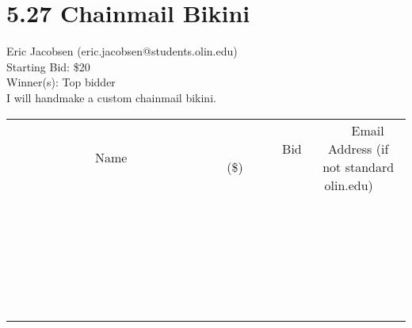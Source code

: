 \documentclass[11pt]{article}
\begin{document}
\section*{5.27 Chainmail Bikini}
Eric Jacobsen (eric.jacobsen@students.olin.edu) \\
Starting Bid: \$20 \\
Winner(s): 
Top bidder \\
I will handmake a custom chainmail bikini. \\[6ex]
\begin{tabular}{c c c}
~~~~~~~~~~~~~Name~~~~~~~~~~~~~ & ~~~~~~~~~Bid (\$)~~~~~~~~~ & ~~~Email Address (if not standard olin.edu)~~~ \\
 & & \\
\hline
 & & \\
\hline
 & & \\
\hline
 & & \\
\hline
 & & \\
\hline
 & & \\
\hline
 & & \\
\hline
 & & \\
\hline
 & & \\
\hline
 & & \\
\hline
 & & \\
\hline
 & & \\
\hline
 & & \\
\hline
 & & \\
\hline
 & & \\
\hline
 & & \\
\hline
 & & \\
\hline
 & & \\
\hline
 & & \\
\hline
 & & \\
\hline
 & & \\
\hline
 & & \\
\hline
 & & \\
\hline
 & & \\
\hline
 & & \\
\hline
 & & \\
\hline
\end{tabular}
\clearpage
\end{document}
